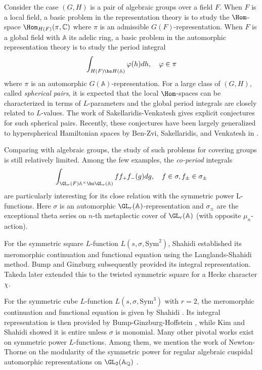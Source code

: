 \documentclass[11pt,reqno]{amsart}
\newcommand{\BA}{{\mathbb {A}}} \newcommand{\BB}{{\mathbb {B}}}
\newcommand{\BC}{{\mathbb {C}}} \newcommand{\BD}{{\mathbb {D}}}
\newcommand{\BQ}{{\mathbb {Q}}} \newcommand{\BR}{{\mathbb {R}}}
\newcommand{\Sym}{{\mathrm{Sym}}}\newcommand{\sgn}{{\mathrm{sgn}}}
\theoremstyle{plain}
\theoremstyle{remark} \newtheorem{remark}[thm]{Remark}
\theoremstyle{definition} \newtheorem{exercise}[thm]{Exercise}
\theoremstyle{definition} \newtheorem{example}[thm]{Example} \newtheorem{condition}[thm]{Condition}
\numberwithin{equation}{section}
\renewcommand{\-}{\text{--}}
\begin{document}
Consider the case  $(G,H)$ is a pair of algebraic groups over a field $F$. When $F$ is a local field, a basic problem in the
representation theory is to study the $\Hom$-space $\Hom_{H(F)}(\pi,\BC)$ where $\pi$ is an admissible $G(F)$-representation. 
When $F$ is a global field with $\BA$ its adelic ring, a basic problem in the automorphic representation theory is to study the period integral
\[\int_{H(F) \bs H(\BA)} \varphi(h)dh, \quad \varphi \in \pi\]
where $\pi$ is an automorphic  $G(\BA)$-representation. For a large class of $(G,H)$, called {\em spherical pairs}, it is expected that
the local $\Hom$-spaces can be characterized in terms of $L$-parameters and the global period integrals are closely related
to $L$-values. The work of Sakellaridis-Venkatesh \cite{SV} gives explicit conjectures for such spherical pairs. Recently, these conjectures 
have been largely generalized to hyperspherical Hamiltonian spaces by Ben-Zvi, Sakellaridis, and
Venkatesh  in \cite{BZSV}. 

Comparing with algebraic groups, the study of such problems for  covering groups is  still relatively limited. Among the few examples,  the  {\em co-period} integrals
\[ \int_{\GL_r(F)\BA^\times \bs \GL_r(\BA)} ff_+f_-(g)dg,\quad f\in \sigma, f_\pm\in\sigma_\pm\]
are particularly interesting for its close relation with the symmetric power L-functions. Here  $\sigma$ is an automorphic   $\GL_r(\BA)$-representation and  $\sigma_\pm$ are the exceptional theta series on $n$-th metaplectic cover of $\GL_r(\BA)$ (with opposite $\mu_n$-action). 

For the symmetric square $L$-function $L(s,\sigma,\Sym^2)$, Shahidi \cite{Sha88}  established its meromorphic continuation and functional equation using the Langlands-Shahidi method. Bump and Ginzburg \cite{BG92} subsequently provided its integral representation. Takeda \cite{Tak14} later extended this to the twisted symmetric square for a Hecke character $\chi$.

For the symmetric cube $L$-function $L(s,\sigma,\Sym^3)$ with $r=2$, the meromorphic continuation and  functional equation is  given by Shahidi \cite{Sha89}. Its integral representation is then provided by Bump-Ginzburg-Hoffstein \cite{BGH96}, while Kim and Shahidi \cite{KS99} showed it is entire unless $\sigma$ is monomial. Many other pivotal works exist on symmetric power $L$-functions. Among them, we mention the work of Newton-Thorne on the
modularity of the symmetric power for regular algebraic cuspidal automorphic
representations on $\GL_2(\BA_\BQ)$ \cite{NT1,NT2}.
\end{document}

